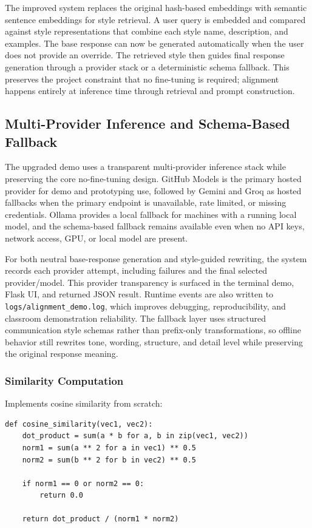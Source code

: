 \documentclass[11pt,a4paper]{article}
\begin{document}
The improved system replaces the original hash-based embeddings with semantic sentence embeddings for style retrieval. A user query is embedded and compared against style representations that combine each style name, description, and examples. The base response can now be generated automatically when the user does not provide an override. The retrieved style then guides final response generation through a provider stack or a deterministic schema fallback. This preserves the project constraint that no fine-tuning is required; alignment happens entirely at inference time through retrieval and prompt construction.

\subsection{Multi-Provider Inference and Schema-Based Fallback}

The upgraded demo uses a transparent multi-provider inference stack while preserving the core no-fine-tuning design. GitHub Models is the primary hosted provider for demo and prototyping use, followed by Gemini and Groq as hosted fallbacks when the primary endpoint is unavailable, rate limited, or missing credentials. Ollama provides a local fallback for machines with a running local model, and the schema-based fallback remains available even when no API keys, network access, GPU, or local model are present.

For both neutral base-response generation and style-guided rewriting, the system records each provider attempt, including failures and the final selected provider/model. This provider transparency is surfaced in the terminal demo, Flask UI, and returned JSON result. Runtime events are also written to \texttt{logs/alignment\_demo.log}, which improves debugging, reproducibility, and classroom demonstration reliability. The fallback layer uses structured communication style schemas rather than prefix-only transformations, so offline behavior still rewrites tone, wording, structure, and detail level while preserving the original response meaning.

\subsubsection{Similarity Computation}

Implements cosine similarity from scratch:

\begin{lstlisting}
def cosine_similarity(vec1, vec2):
    dot_product = sum(a * b for a, b in zip(vec1, vec2))
    norm1 = sum(a ** 2 for a in vec1) ** 0.5
    norm2 = sum(b ** 2 for b in vec2) ** 0.5
    
    if norm1 == 0 or norm2 == 0:
        return 0.0
    
    return dot_product / (norm1 * norm2)
\end{lstlisting}
\end{document}
